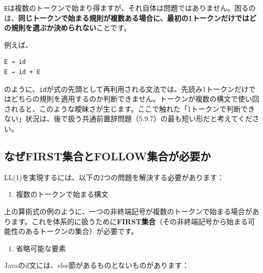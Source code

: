 \texttt{E}は複数のトークンで始まり得ますが、それ自体は問題ではありません。困るのは、\textbf{同じトークンで始まる規則が複数ある場合に、最初の1トークンだけではどの規則を選ぶか決められない}ことです。

例えば、

\begin{verbatim}
E → id
E → id + E
\end{verbatim}

のように、\texttt{id}が式の先頭として再利用される文法では、先読み1トークンだけではどちらの規則を適用するのか判断できません。トークンが複数の構文で使い回されると、このような曖昧さが生じます。ここで触れた「1トークンで判断できない」状況は、後で扱う共通前置辞問題（5.9.7）の最も短い形だと考えてください。

\hypertarget{chapter5-ux306aux305cfirstux96c6ux5408ux3068followux96c6ux5408ux304cux5fc5ux8981ux304b}{%
\subsection{なぜFIRST集合とFOLLOW集合が必要か}\label{chapter5-ux306aux305cfirstux96c6ux5408ux3068followux96c6ux5408ux304cux5fc5ux8981ux304b}}

LL(1)を実現するには、以下の2つの問題を解決する必要があります：

\begin{enumerate}
\def\labelenumi{\arabic{enumi}.}
\tightlist
\item
  複数のトークンで始まる構文
\end{enumerate}

上の算術式の例のように、一つの非終端記号が複数のトークンで始まる場合があります。これを体系的に扱うために\textbf{FIRST集合}（その非終端記号から始まる可能性のあるトークンの集合）が必要です。

\begin{enumerate}
\def\labelenumi{\arabic{enumi}.}
\setcounter{enumi}{1}
\tightlist
\item
  省略可能な要素
\end{enumerate}

Javaのif文には、else節があるものとないものがあります：

\begin{Shaded}
\begin{Highlighting}[]
\NormalTok{\}}

\NormalTok{\} }\NormalTok{ \{ }\NormalTok{\}}
\end{Highlighting}
\end{Shaded}


